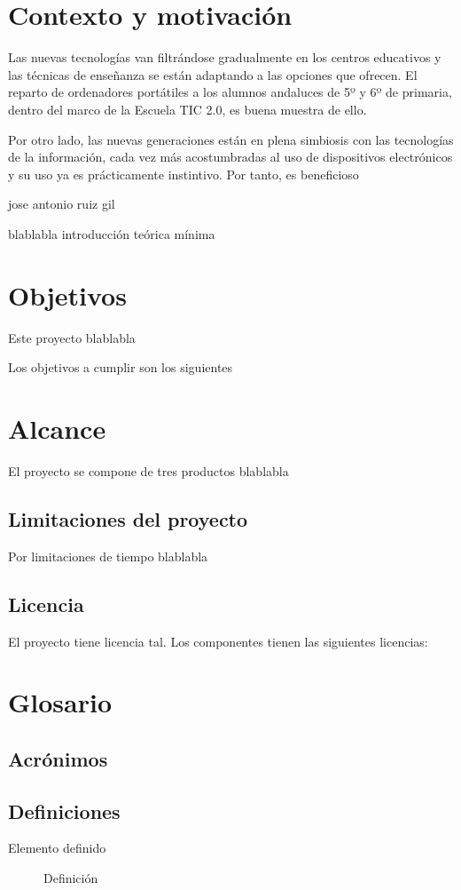 \section{Contexto y motivación}
Las nuevas tecnologías van filtrándose gradualmente en los centros
educativos y las técnicas de enseñanza se están adaptando a las
opciones que ofrecen. El reparto de ordenadores portátiles a los
alumnos andaluces de 5º y 6º de primaria, dentro del marco de la
Escuela TIC 2.0, es buena muestra de ello. 

Por otro lado, las nuevas generaciones están en plena simbiosis con
las tecnologías de la información, cada vez más acostumbradas al uso
de dispositivos electrónicos y su uso ya es prácticamente
instintivo. Por tanto, es beneficioso 

jose antonio ruiz gil

blablabla introducción teórica mínima

\section{Objetivos}

Este proyecto blablabla

Los objetivos a cumplir son los siguientes

\section{Alcance}

El proyecto se compone de tres productos blablabla

\subsection{Limitaciones del proyecto}

Por limitaciones de tiempo blablabla

\subsection{Licencia}

El proyecto tiene licencia tal. Los componentes tienen las siguientes licencias:

\section{Glosario}

\subsection{Acrónimos}



\subsection{Definiciones}

\begin{description}
\item[Elemento definido] 
  Definición
\end{description}
